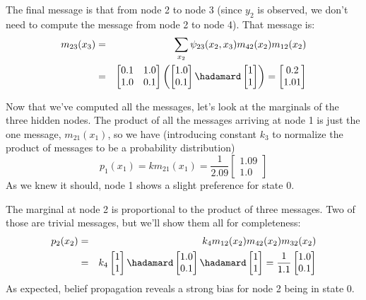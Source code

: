 The final message is that from node 2 to node 3 (since $y_2$ is
observed, we don't need to compute the message from node 2 to node
4).  That message is:
\begin{eqnarray}
m_{23}(x_3) & = & \sum_{x_2} \psi_{23} (x_2, x_3)   m_{42}(x_2) m_{12}(x_2) \nonumber  \\
& = & 
\begin{bmatrix}
0.1 & 1.0 \\
1.0 & 0.1 
\end{bmatrix}
\left(
\begin{bmatrix}
1.0 \\
0.1
\end{bmatrix}
\hadamard
\begin{bmatrix}
1 \\
1
\end{bmatrix}
\right) 
=
\begin{bmatrix}
0.2 \\
1.01
\end{bmatrix}
\end{eqnarray}

Now that we've computed all the messages, let's look at the marginals
of the three hidden nodes.  The product of all the messages arriving
at node 1 is just the one message, $m_{21}(x_1)$, so we have
(introducing constant $k_3$ to normalize the product of messages to be a
probability distribution)
\begin{equation}
p_1(x_1) = k m_{21}(x_1) 
=
\frac{1}{2.09}
\begin{bmatrix}
1.09 \\
1.0
\end{bmatrix}
\end{equation}
As we knew it should, node 1 shows a slight preference for state 0.

The marginal at node 2 is proportional to the product of three messages.
Two of those are trivial messages, but we'll show them all for
completeness:
\begin{eqnarray}
p_2(x_2) & = & k_4 m_{12}(x_2)  m_{42}(x_2)  m_{32}(x_2) \\
& = & k_4 
\begin{bmatrix} 
1 \\ 
1
\end{bmatrix}
\hadamard
\begin{bmatrix}
1.0 \\
0.1
\end{bmatrix}
\hadamard
\begin{bmatrix}
1 \\ 
1
\end{bmatrix}
=
\frac{1}{1.1}
\begin{bmatrix}
1.0 \\
0.1
\end{bmatrix}
\end{eqnarray}
As expected, belief propagation reveals a strong bias for node 2 being in state 0.

